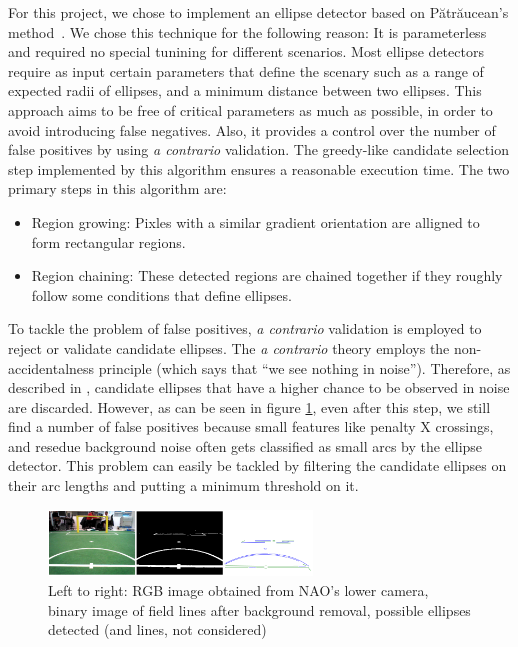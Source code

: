 \documentclass[	DIV=calc,%
							paper=a4,%
							fontsize=9pt,%
							twocolumn]{scrartcl}	 					%
\begin{document}
For this project, we chose to implement an ellipse detector based on P{\u{a}}tr{\u{a}}ucean's method~\cite{ED}. We chose this technique for the following reason: It is parameterless and required no special tunining for different scenarios. Most ellipse detectors require as input certain parameters that define the scenary such as a range of expected radii of ellipses, and a minimum distance between two ellipses. This approach aims to be free of critical parameters as much as possible, in order to avoid introducing false negatives. Also, it provides a control over the number of false positives by using \emph{a contrario} validation. The greedy-like candidate selection step implemented by this algorithm ensures a reasonable execution time. The two primary steps in this algorithm are: 

\begin{itemize}
\item Region growing: Pixles with a similar gradient orientation are alligned to form rectangular regions.
\item Region chaining: These detected regions are chained together if they roughly follow some conditions that define ellipses.
\end{itemize}

To tackle the problem of false positives, \emph{a contrario} validation is employed to reject or validate candidate ellipses. The \emph{a contrario} theory employs the non-accidentalness principle (which says that ``we see nothing in noise''). Therefore, as described in \cite{ED}, candidate ellipses that have a higher chance to be observed in noise are discarded. %
However, as can be seen in figure \ref{fig:ED}, even after this step, we still find a number of false positives because small features like penalty X crossings, and resedue background noise often gets classified as small arcs by the ellipse detector. This problem can easily be tackled by filtering the candidate ellipses on their arc lengths and putting a minimum threshold on it.

\begin{figure}
\includegraphics[width = 265px]{figures/ellipseDetection.png}
\caption{Left to right: RGB image obtained from NAO's lower camera, binary image of field lines after background removal, possible ellipses detected (and lines, not considered) }
\label{fig:ED}
\end{figure}
\end{document}
